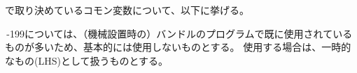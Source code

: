 
\DMname で取り決めているコモン変数について、以下に挙げる。





\,-\pcrNum199については、（機械設置時の）バンドルのプログラムで既に使用されているものが多いため、基本的には使用しないものとする。
使用する場合は、一時的なもの(LHS)として扱うものとする。\\


